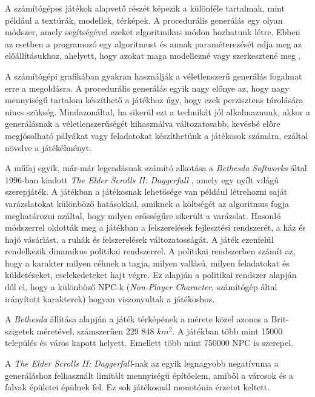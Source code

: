 

A számítógépes játékok alapvető részét képezik a különféle tartalmak, mint például a textúrák, modellek, térképek. A procedurális generálás egy olyan módszer, amely segítségével ezeket algoritmikus módon hozhatunk létre. Ebben az esetben a programozó egy algoritmust és annak paraméterezését adja meg az előállításukhoz, ahelyett, hogy azokat maga modellezné vagy szerkesztené meg \cite{ProceduralGeneration}.

A számítógépi grafikában gyakran használják a véletlenszerű generálás fogalmat erre a megoldásra. A procedurális generálás egyik nagy előnye az, hogy nagy mennyiségű tartalom készíthető a játékhoz úgy, hogy ezek perzisztens tárolására nincs szükség. Mindazonáltal, ha sikerül ezt a technikát jól alkalmaznunk, akkor a generálásnak a véletlenszerűségét kihasználva változatosabb, kevésbé előre megjósolható pályákat vagy feladatokat készíthetünk a játékosok számára, ezáltal növelve a játékélményt.  


A műfaj egyik, már-már legendásnak számító alkotása a \textit{Bethesda Softworks} által 1996-ban kiadott \textit{The Elder Scrolls II: Daggerfall} \cite{Daggerfall}, amely egy nyílt világú szerepjáték. A játékban a játékosnak lehetősége van például létrehozni saját varázslatokat különböző hatásokkal, amiknek a költségét az algoritmus fogja meghatározni azáltal, hogy milyen erősségűre sikerült a varázslat. Hasonló módszerrel oldották meg a játékban a felszerelések fejlesztési rendszerét, a ház és hajó vásárlást, a ruhák és felszerelések változatosságát. A játék ezenfelül rendelkezik dinamikus politikai rendszerrel. A politikai rendszerben számít az, hogy a karakter milyen céhnek a tagja, milyen vallású, milyen feladatokat és küldetéseket, cselekedeteket hajt végre. Ez alapján a politikai rendszer alapján dől el, hogy a különböző NPC-k (\textit{Non-Player Character}, számítógép által irányított karakterek) hogyan viszonyultak a játékoshoz. 

A \textit{Bethesda} állítása alapján a játék térképének a mérete közel azonos a Brit-szigetek méretével, számszerűen 229 848 $km^2$. A játékban több mint 15000 település és város kapott helyett. Emellett több mint 750000 NPC is szerepel. 

A \textit{The Elder Scrolls II: Daggerfall}-nak az egyik legnagyobb negatívuma a generáláshoz felhasznált limitált mennyiségű építőelem, amiből a városok és a falvak épületei épülnek fel. Ez sok játékosnál monotónia érzetet keltett. 

